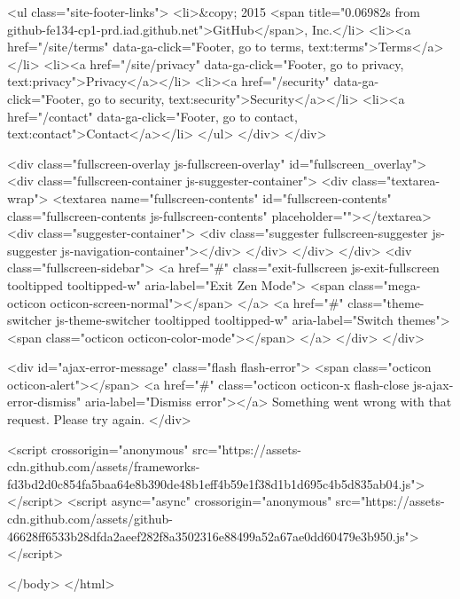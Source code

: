     <ul class="site-footer-links">
      <li>&copy; 2015 <span title="0.06982s from github-fe134-cp1-prd.iad.github.net">GitHub</span>, Inc.</li>
        <li><a href="/site/terms" data-ga-click="Footer, go to terms, text:terms">Terms</a></li>
        <li><a href="/site/privacy" data-ga-click="Footer, go to privacy, text:privacy">Privacy</a></li>
        <li><a href="/security" data-ga-click="Footer, go to security, text:security">Security</a></li>
        <li><a href="/contact" data-ga-click="Footer, go to contact, text:contact">Contact</a></li>
    </ul>
  </div>
</div>


    <div class="fullscreen-overlay js-fullscreen-overlay" id="fullscreen_overlay">
  <div class="fullscreen-container js-suggester-container">
    <div class="textarea-wrap">
      <textarea name="fullscreen-contents" id="fullscreen-contents" class="fullscreen-contents js-fullscreen-contents" placeholder=""></textarea>
      <div class="suggester-container">
        <div class="suggester fullscreen-suggester js-suggester js-navigation-container"></div>
      </div>
    </div>
  </div>
  <div class="fullscreen-sidebar">
    <a href="#" class="exit-fullscreen js-exit-fullscreen tooltipped tooltipped-w" aria-label="Exit Zen Mode">
      <span class="mega-octicon octicon-screen-normal"></span>
    </a>
    <a href="#" class="theme-switcher js-theme-switcher tooltipped tooltipped-w"
      aria-label="Switch themes">
      <span class="octicon octicon-color-mode"></span>
    </a>
  </div>
</div>



    

    <div id="ajax-error-message" class="flash flash-error">
      <span class="octicon octicon-alert"></span>
      <a href="#" class="octicon octicon-x flash-close js-ajax-error-dismiss" aria-label="Dismiss error"></a>
      Something went wrong with that request. Please try again.
    </div>


      <script crossorigin="anonymous" src="https://assets-cdn.github.com/assets/frameworks-fd3bd2d0c854fa5baa64e8b390de48b1eff4b59e1f38d1b1d695c4b5d835ab04.js"></script>
      <script async="async" crossorigin="anonymous" src="https://assets-cdn.github.com/assets/github-46628ff6533b28dfda2aeef282f8a3502316e88499a52a67ae0dd60479e3b950.js"></script>
      
      

  </body>
</html>


